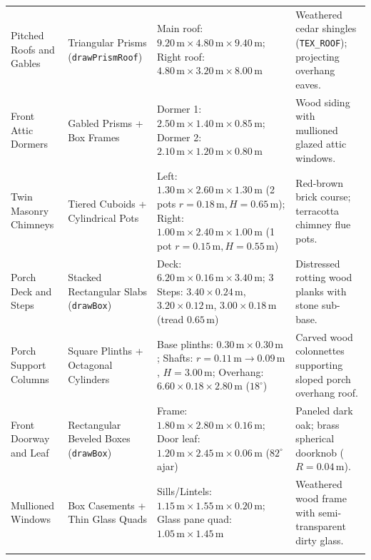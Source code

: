\documentclass[10pt,a4paper,oneside]{article}
\begin{document}
\begin{longtable}{>{\raggedright\arraybackslash}p{}>{\raggedright\arraybackslash}p{}>{\raggedright\arraybackslash}p{}>{\raggedright\arraybackslash}p{}}
Pitched Roofs and Gables & Triangular Prisms (\texttt{drawPrismRoof}) & Main roof: $9.20\,\mathrm{m} \times 4.80\,\mathrm{m} \times 9.40\,\mathrm{m}$; Right roof: $4.80\,\mathrm{m} \times 3.20\,\mathrm{m} \times 8.00\,\mathrm{m}$ & Weathered cedar shingles (\texttt{TEX\_ROOF}); projecting overhang eaves.\\\addlinespace[3pt]

Front Attic Dormers & Gabled Prisms + Box Frames & Dormer 1: $2.50\,\mathrm{m} \times 1.40\,\mathrm{m} \times 0.85\,\mathrm{m}$; Dormer 2: $2.10\,\mathrm{m} \times 1.20\,\mathrm{m} \times 0.80\,\mathrm{m}$ & Wood siding with mullioned glazed attic windows.\\\addlinespace[3pt]

Twin Masonry Chimneys & Tiered Cuboids + Cylindrical Pots & Left: $1.30\,\mathrm{m} \times 2.60\,\mathrm{m} \times 1.30\,\mathrm{m}$ (2 pots $r=0.18\,\mathrm{m}, H=0.65\,\mathrm{m}$); Right: $1.00\,\mathrm{m} \times 2.40\,\mathrm{m} \times 1.00\,\mathrm{m}$ (1 pot $r=0.15\,\mathrm{m}, H=0.55\,\mathrm{m}$) & Red-brown brick course; terracotta chimney flue pots.\\\addlinespace[3pt]

Porch Deck and Steps & Stacked Rectangular Slabs (\texttt{drawBox}) & Deck: $6.20\,\mathrm{m} \times 0.16\,\mathrm{m} \times 3.40\,\mathrm{m}$; 3 Steps: $3.40\times 0.24\,\mathrm{m}$, $3.20\times 0.12\,\mathrm{m}$, $3.00\times 0.18\,\mathrm{m}$ (tread $0.65\,\mathrm{m}$) & Distressed rotting wood planks with stone sub-base.\\\addlinespace[3pt]

Porch Support Columns & Square Plinths + Octagonal Cylinders & 4 Base plinths: $0.30\,\mathrm{m}\times 0.30\,\mathrm{m}$; Shafts: $r=0.11\,\mathrm{m}\to 0.09\,\mathrm{m}$, $H=3.00\,\mathrm{m}$; Overhang: $6.60\times 0.18\times 2.80\,\mathrm{m}$ ($18^\circ$) & Carved wood colonnettes supporting sloped porch overhang roof.\\\addlinespace[3pt]

Front Doorway and Leaf & Rectangular Beveled Boxes (\texttt{drawBox}) & Frame: $1.80\,\mathrm{m} \times 2.80\,\mathrm{m} \times 0.16\,\mathrm{m}$; Door leaf: $1.20\,\mathrm{m} \times 2.45\,\mathrm{m} \times 0.06\,\mathrm{m}$ ($82^\circ$ ajar) & Paneled dark oak; brass spherical doorknob ($R=0.04\,\mathrm{m}$).\\\addlinespace[3pt]

Mullioned Windows & Box Casements + Thin Glass Quads & Sills/Lintels: $1.15\,\mathrm{m} \times 1.55\,\mathrm{m} \times 0.20\,\mathrm{m}$; Glass pane quad: $1.05\,\mathrm{m} \times 1.45\,\mathrm{m}$ & Weathered wood frame with semi-transparent dirty glass.\\\addlinespace[3pt]


\end{longtable}
\end{document}
